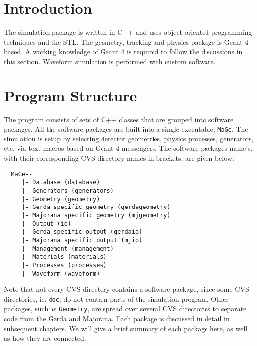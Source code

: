 \section{Introduction }

The simulation package is written in C++ and uses object-{}oriented
         programming techniques and the STL. 
         The geometry, tracking and physics package
         is Geant 4 based. A working knowledge of Geant 4 is required to 
         follow the discussions in this section. 
         Waveform simulation is performed with custom software.
 

\section{Program Structure}

       The program consists of sets of C++ classes that are grouped into
      software packages. All the software packages are built into a 
      single executable, \nolinkurl{MaGe}. The simulation is 
      setup by selecting detector geometries,
      physics processes, generators, etc. via text macros based on Geant 4 
      messengers. The software packages name's, with their corresponding CVS
      directory names in brackets, are given below: 
 

\begin{lstlisting}
  MaGe--
     |- Database (database)
     |- Generators (generators)
     |- Geometry (geometry)
     |- Gerda specific geometry (gerdageometry)
     |- Majorana specific geometry (mjgeometry)
     |- Output (io)
     |- Gerda specific output (gerdaio)
     |- Majorana specific output (mjio)
     |- Management (management)
     |- Materials (materials)
     |- Processes (processes)
     |- Waveform (waveform)
   \end{lstlisting}

      Note that not every CVS directory contains a software package, since 
     some CVS directories, ie. \nolinkurl{doc}, do not contain
     parts of the simulation program. Other packages, such as 
 \nolinkurl{Geometry}, are spread over several CVS directories
     to separate code from the Gerda and Majorana.  
     Each package is discussed in detail in subsequent chapters. We will give
     a brief summary of each package here, as well as how they are connected.
 

